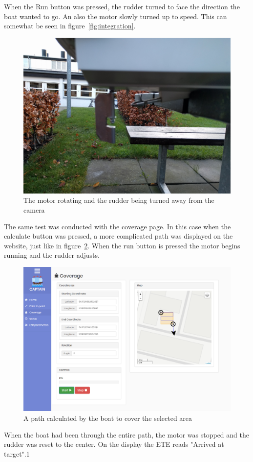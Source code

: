 When the Run button was pressed, the rudder turned to face the direction the boat wanted to go. An also the motor slowly turned up to speed. This can somewhat be seen in figure~\ref{fig:integration}.

\begin{figure}[H]
\centering
\includegraphics[width=0.7\linewidth]{Images/Integration/IMG_20171208_093712}
\caption{The motor rotating and the rudder being turned away from the camera}
\label{fig:integration_motor}
\end{figure}

The same test was conducted with the coverage page. In this case when the calculate button was pressed, a more complicated path was displayed on the website, just like in figure~\ref{fig:integration_coverage}. When the run button is pressed the motor begins running and the rudder adjusts. 

\begin{figure}[h]
\centering
\includegraphics[width=0.9\linewidth]{Images/Integration/integration_coverage}
\caption{A path calculated by the boat to cover the selected area}
\label{fig:integration_coverage}
\end{figure}
 
When the boat had been through the entire path, the motor was stopped and the rudder was reset to the center. On the display the ETE reads "Arrived at target".1








